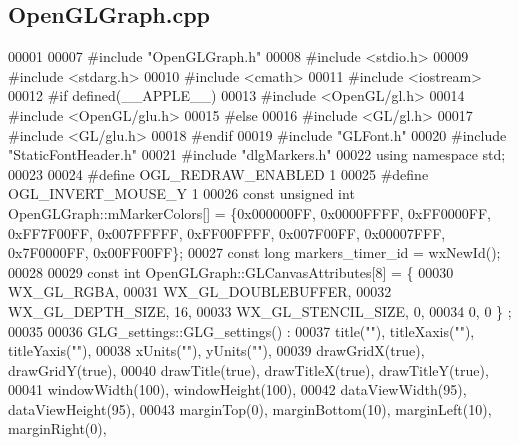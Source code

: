 \subsection{Open\+G\+L\+Graph.\+cpp}
\label{OpenGLGraph_8cpp_source}

\begin{DoxyCode}
00001 
00007 \textcolor{preprocessor}{#include "OpenGLGraph.h"}
00008 \textcolor{preprocessor}{#include <stdio.h>}
00009 \textcolor{preprocessor}{#include <stdarg.h>}
00010 \textcolor{preprocessor}{#include <cmath>}
00011 \textcolor{preprocessor}{#include <iostream>}
00012 \textcolor{preprocessor}{#if defined(\_\_APPLE\_\_)}
00013 \textcolor{preprocessor}{#include <OpenGL/gl.h>}
00014 \textcolor{preprocessor}{#include <OpenGL/glu.h>}
00015 \textcolor{preprocessor}{#else}
00016 \textcolor{preprocessor}{#include <GL/gl.h>}
00017 \textcolor{preprocessor}{#include <GL/glu.h>}
00018 \textcolor{preprocessor}{#endif}
00019 \textcolor{preprocessor}{#include "GLFont.h"}
00020 \textcolor{preprocessor}{#include "StaticFontHeader.h"}
00021 \textcolor{preprocessor}{#include "dlgMarkers.h"}
00022 \textcolor{keyword}{using namespace }std;
00023 
00024 \textcolor{preprocessor}{#define OGL\_REDRAW\_ENABLED 1}
00025 \textcolor{preprocessor}{#define OGL\_INVERT\_MOUSE\_Y 1}
00026 \textcolor{keyword}{const} \textcolor{keywordtype}{unsigned} \textcolor{keywordtype}{int} OpenGLGraph::mMarkerColors[] = \{0x000000FF, 0x0000FFFF, 0xFF0000FF, 0xFF7F00FF, 
      0x007FFFFF, 0xFF00FFFF, 0x007F00FF, 0x00007FFF, 0x7F0000FF, 0x00FF00FF\};
00027 \textcolor{keyword}{const} \textcolor{keywordtype}{long} markers_timer_id = wxNewId();
00028 
00029 \textcolor{keyword}{const} \textcolor{keywordtype}{int} OpenGLGraph::GLCanvasAttributes[8] = \{
00030     WX\_GL\_RGBA,
00031     WX\_GL\_DOUBLEBUFFER,
00032     WX\_GL\_DEPTH\_SIZE, 16,
00033     WX\_GL\_STENCIL\_SIZE, 0,
00034     0, 0 \} ;
00035 
00036 GLG_settings::GLG_settings() :
00037     title(\textcolor{stringliteral}{""}), titleXaxis(\textcolor{stringliteral}{""}), titleYaxis(\textcolor{stringliteral}{""}),
00038     xUnits(\textcolor{stringliteral}{""}), yUnits(\textcolor{stringliteral}{""}),
00039     drawGridX(true), drawGridY(true),
00040     drawTitle(true), drawTitleX(true), drawTitleY(true),
00041     windowWidth(100),   windowHeight(100),
00042     dataViewWidth(95), dataViewHeight(95),
00043     marginTop(0), marginBottom(10), marginLeft(10), marginRight(0),

\end{DoxyCode}
